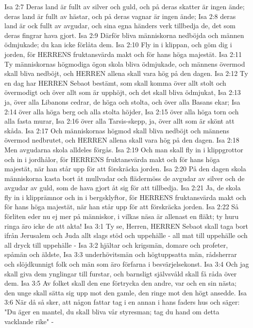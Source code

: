Isa 2:7  Deras land är fullt av silver och guld, och på deras skatter är ingen ände; deras land är fullt av hästar, och på deras vagnar är ingen ände;
Isa 2:8  deras land är ock fullt av avgudar, och sina egna händers verk tillbedja de, det som deras fingrar hava gjort.
Isa 2:9  Därför bliva människorna nedböjda och männen ödmjukade; du kan icke förlåta dem.
Isa 2:10  Fly in i klippan, och göm dig i jorden, för HERRENS fruktansvärda makt och för hans höga majestät.
Isa 2:11  Ty människornas högmodiga ögon skola bliva ödmjukade, och männens övermod skall bliva nedböjt, och HERREN allena skall vara hög på den dagen.
Isa 2:12  Ty en dag har HERREN Sebaot bestämt, som skall komma över allt stolt och övermodigt och över allt som är upphöjt, och det skall bliva ödmjukat,
Isa 2:13  ja, över alla Libanons cedrar, de höga och stolta, och över alla Basans ekar;
Isa 2:14  över alla höga berg och alla stolta höjder,
Isa 2:15  över alla höga torn och alla fasta murar,
Isa 2:16  över alla Tarsis-skepp, ja, över allt som är skönt att skåda.
Isa 2:17  Och människornas högmod skall bliva nedböjt och männens övermod nedbrutet, och HERREN allena skall vara hög på den dagen.
Isa 2:18  Men avgudarna skola alldeles förgås.
Isa 2:19  Och man skall fly in i klippgrottor och in i jordhålor, för HERRENS fruktansvärda makt och för hans höga majestät, när han står upp för att förskräcka jorden.
Isa 2:20  På den dagen skola människorna kasta bort åt mullvadar och flädermöss de avgudar av silver och de avgudar av guld, som de hava gjort åt sig för att tillbedja.
Isa 2:21  Ja, de skola fly in i klipprämnor och in i bergsklyftor, för HERRENS fruktansvärda makt och för hans höga majestät, när han står upp för att förskräcka jorden.
Isa 2:22  Så förliten eder nu ej mer på människor, i vilkas näsa är allenast en fläkt; ty huru ringa äro icke de att akta!
Isa 3:1  Ty se, Herren, HERREN Sebaot skall taga bort ifrån Jerusalem och Juda allt slags stöd och uppehälle - all mat till uppehälle och all dryck till uppehälle -
Isa 3:2  hjältar och krigsmän, domare och profeter, spåmän och äldste,
Isa 3:3  underhövitsmän och högtuppsatta män, rådsherrar och slöjdkunnigt folk och män som äro förfarna i besvärjelsekonst.
Isa 3:4  Och jag skall giva dem ynglingar till furstar, och barnsligt självsvåld skall få råda över dem.
Isa 3:5  Av folket skall den ene förtrycka den andre, var och en sin nästa; den unge skall sätta sig upp mot den gamle, den ringe mot den högt ansedde.
Isa 3:6  När då så sker, att någon fattar tag i en annan i hans faders hus och säger: "Du äger en mantel, du skall bliva vår styresman; tag du hand om detta vacklande rike" -
